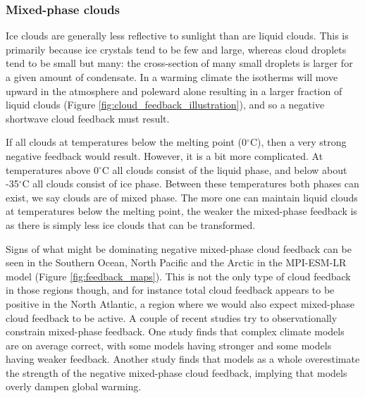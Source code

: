 \documentclass[12pt]{book}
\begin{document}
\subsubsection{Mixed-phase clouds}
Ice clouds are generally less reflective to sunlight than are liquid clouds. This is primarily because ice crystals tend to be few and large, whereas cloud droplets tend to be small but many: the cross-section of many small droplets is larger for a given amount of condensate. In a warming climate the isotherms will move upward in the atmosphere and poleward alone resulting in a larger fraction of liquid clouds (Figure \ref{fig:cloud_feedback_illustration}), and so a negative shortwave cloud feedback must result. 

If all clouds at temperatures below the melting point (0$^\circ$C), then a very strong negative feedback would result. However, it is a bit more complicated. At temperatures above 0$^\circ$C all clouds consist of the liquid phase, and below about -35$^\circ$C all clouds consist of ice phase. Between these temperatures both phases can exist, we say clouds are of mixed phase. The more one can maintain liquid clouds at temperatures below the melting point, the weaker the mixed-phase feedback is as there is simply less ice clouds that can be transformed.

Signs of what might be dominating negative mixed-phase cloud feedback can be seen in the Southern Ocean, North Pacific and the Arctic in the MPI-ESM-LR model (Figure \ref{fig:feedback_maps}). This is not the only type of cloud feedback in those regions though, and for instance total cloud feedback appears to be positive in the North Atlantic, a region where we would also expect mixed-phase cloud feedback to be active. A couple of recent studies try to observationally constrain mixed-phase feedback. One study finds that complex climate models are on average correct, with some models having stronger and some models having weaker feedback. Another study finds that models as a whole overestimate the strength of the negative mixed-phase cloud feedback, implying that models overly dampen global warming.
\end{document}
